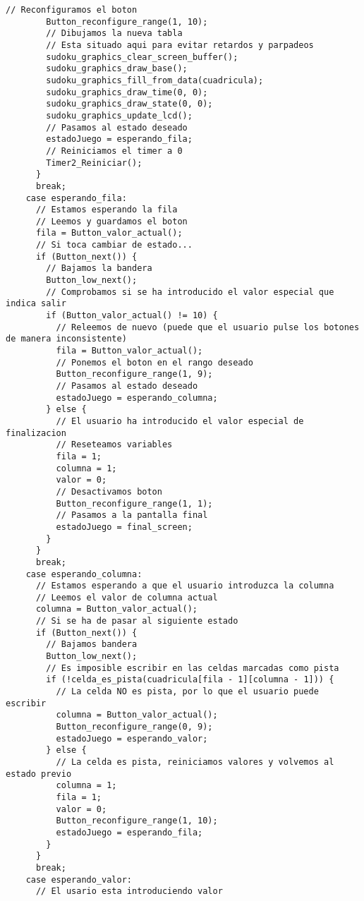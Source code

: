 \documentclass[12pt,letterpaper]{article}
\begin{document}
{\begin{lstlisting}[frame=single]
        // Reconfiguramos el boton
        Button_reconfigure_range(1, 10);  
        // Dibujamos la nueva tabla
        // Esta situado aqui para evitar retardos y parpadeos
        sudoku_graphics_clear_screen_buffer();
        sudoku_graphics_draw_base();
        sudoku_graphics_fill_from_data(cuadricula);
        sudoku_graphics_draw_time(0, 0);
        sudoku_graphics_draw_state(0, 0);
        sudoku_graphics_update_lcd();  
        // Pasamos al estado deseado
        estadoJuego = esperando_fila;
        // Reiniciamos el timer a 0
        Timer2_Reiniciar();
      }
      break;
    case esperando_fila:
      // Estamos esperando la fila
      // Leemos y guardamos el boton
      fila = Button_valor_actual();
      // Si toca cambiar de estado...
      if (Button_next()) {
        // Bajamos la bandera
        Button_low_next();
        // Comprobamos si se ha introducido el valor especial que indica salir
        if (Button_valor_actual() != 10) {
          // Releemos de nuevo (puede que el usuario pulse los botones de manera inconsistente)
          fila = Button_valor_actual();
          // Ponemos el boton en el rango deseado
          Button_reconfigure_range(1, 9);
          // Pasamos al estado deseado
          estadoJuego = esperando_columna;
        } else {
          // El usuario ha introducido el valor especial de finalizacion
          // Reseteamos variables
          fila = 1;
          columna = 1;
          valor = 0;
          // Desactivamos boton
          Button_reconfigure_range(1, 1);
          // Pasamos a la pantalla final
          estadoJuego = final_screen;
        }
      }
      break;
    case esperando_columna:
      // Estamos esperando a que el usuario introduzca la columna
      // Leemos el valor de columna actual
      columna = Button_valor_actual();
      // Si se ha de pasar al siguiente estado
      if (Button_next()) {
        // Bajamos bandera
        Button_low_next();
        // Es imposible escribir en las celdas marcadas como pista
        if (!celda_es_pista(cuadricula[fila - 1][columna - 1])) {
          // La celda NO es pista, por lo que el usuario puede escribir
          columna = Button_valor_actual();
          Button_reconfigure_range(0, 9);
          estadoJuego = esperando_valor;
        } else {
          // La celda es pista, reiniciamos valores y volvemos al estado previo
          columna = 1;
          fila = 1;
          valor = 0;
          Button_reconfigure_range(1, 10);
          estadoJuego = esperando_fila;
        }
      }
      break;
    case esperando_valor:
      // El usario esta introduciendo valor

\end{lstlisting}}
\end{document}
